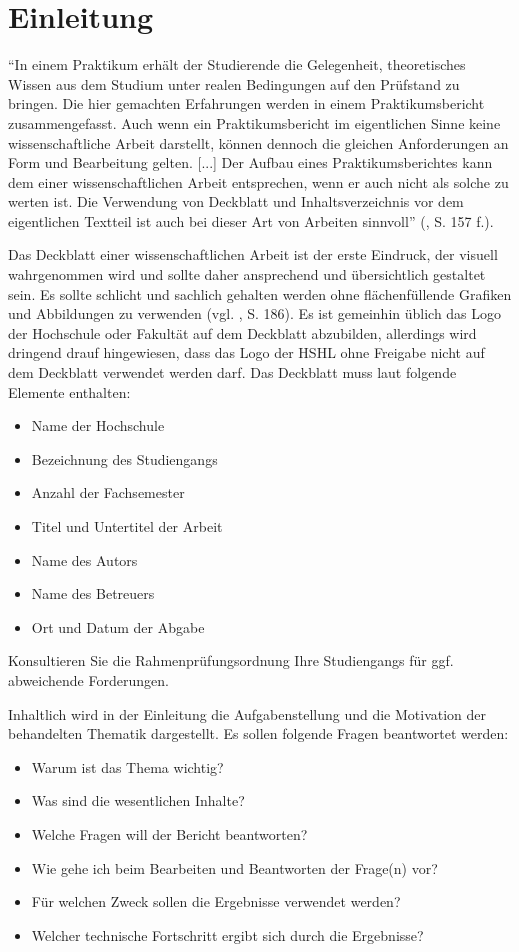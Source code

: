 \chapter{Einleitung}
\label{sec:Einleitung}
"`In einem Praktikum erhält der Studierende die Gelegenheit, theoretisches Wissen aus dem Studium unter realen Bedingungen auf den Prüfstand zu bringen.
Die hier gemachten Erfahrungen werden in einem Praktikumsbericht zusammengefasst.
Auch wenn ein Praktikumsbericht im eigentlichen Sinne keine wissenschaftliche Arbeit darstellt, können dennoch die gleichen Anforderungen an Form und Bearbeitung gelten.
[...] Der Aufbau eines Praktikumsberichtes kann dem einer wissenschaftlichen Arbeit entsprechen, wenn er auch nicht als solche zu werten ist.
Die Verwendung von Deckblatt und Inhaltsverzeichnis vor dem eigentlichen Textteil ist auch bei dieser Art von Arbeiten sinnvoll"' (\cite{Balz2008}, S. 157 f.).

Das Deckblatt einer wissenschaftlichen Arbeit ist der erste Eindruck, der visuell wahrgenommen wird und sollte daher ansprechend und übersichtlich gestaltet sein.
Es sollte schlicht und sachlich gehalten werden ohne flächenfüllende Grafiken und Abbildungen zu verwenden (vgl. \cite{Balz2008}, S. 186).
Es ist gemeinhin üblich das Logo der Hochschule oder Fakultät auf dem Deckblatt abzubilden, allerdings wird dringend drauf hingewiesen, dass das Logo der HSHL ohne Freigabe nicht auf dem Deckblatt verwendet werden darf.
Das Deckblatt muss laut \cite[S.\,187]{Balz2008}  folgende Elemente enthalten:
\begin{itemize}
\item Name der Hochschule
\item Bezeichnung des Studiengangs
\item Anzahl der Fachsemester
\item Titel und Untertitel der Arbeit
\item Name des Autors
\item Name des Betreuers
\item Ort und Datum der Abgabe 
\end{itemize}
Konsultieren Sie die Rahmenprüfungsordnung Ihre Studiengangs für ggf. abweichende Forderungen.

Inhaltlich wird in der Einleitung die Aufgabenstellung und die Motivation der behandelten Thematik dargestellt.
Es sollen folgende Fragen beantwortet werden:
\begin{itemize}
\item Warum ist das Thema wichtig?
\item Was sind die wesentlichen Inhalte?
\item Welche Fragen will der Bericht beantworten?
\item Wie gehe ich beim Bearbeiten und Beantworten der Frage(n) vor?
\item Für welchen Zweck sollen die Ergebnisse verwendet werden?
\item Welcher technische Fortschritt ergibt sich durch die Ergebnisse? \cite[S.~27]{Karm2011}
\end{itemize}

